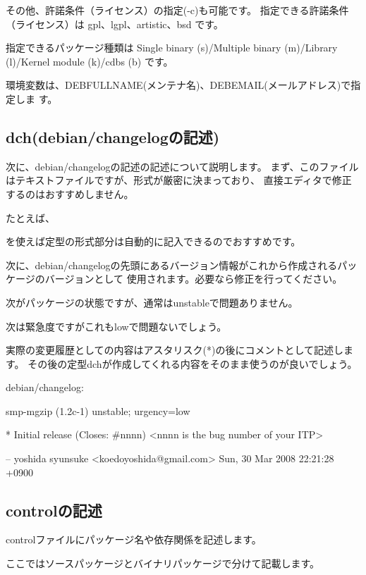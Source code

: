\documentclass[mingoth,a4paper]{jsarticle}
\begin{document}
その他、許諾条件（ライセンス）の指定(-c)も可能です。
指定できる許諾条件（ライセンス）は gpl、lgpl、artistic、bsd です。

指定できるパッケージ種類は
Single binary (s)/Multiple binary (m)/Library (l)/Kernel module (k)/cdbs
(b) です。

環境変数は、DEBFULLNAME(メンテナ名)、DEBEMAIL(メールアドレス)で指定しま
す。

\subsection{dch(debian/changelogの記述)}

次に、debian/changelogの記述の記述について説明します。
まず、このファイルはテキストファイルですが、形式が厳密に決まっており、
直接エディタで修正するのはおすすめしません。

たとえば、
を使えば定型の形式部分は自動的に記入できるのでおすすめです。

次に、debian/changelogの先頭にあるバージョン情報がこれから作成されるパッケージのバージョンとして
使用されます。必要なら修正を行ってください。

次がパッケージの状態ですが、通常はunstableで問題ありません。

次は緊急度ですがこれもlowで問題ないでしょう。

実際の変更履歴としての内容はアスタリスク(*)の後にコメントとして記述します。
その後の定型dchが作成してくれる内容をそのまま使うのが良いでしょう。

debian/changelog:
\begin{commandline}
 smp-mgzip (1.2c-1) unstable; urgency=low

  * Initial release (Closes: #nnnn)  <nnnn is the bug number of your ITP>

 -- yoshida syunsuke <koedoyoshida@gmail.com>  Sun, 30 Mar 2008 22:21:28 +0900
\end{commandline}


\subsection{controlの記述}
controlファイルにパッケージ名や依存関係を記述します。

ここではソースパッケージとバイナリパッケージで分けて記載します。
\end{document}
